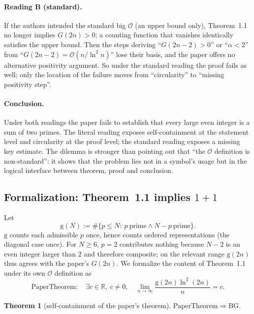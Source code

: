 \documentclass[11pt,a4paper]{article}
\theoremstyle{plain}
\newtheorem{theorem}{Theorem}[section]
\theoremstyle{definition}
\newcommand{\BG}{\mathrm{BG}}
\newcommand{\PaperTheorem}{\mathrm{PaperTheorem}}
\newcommand{\gcount}{\mathrm{g}}
\newcommand{\R}{\mathbb{R}}
\begin{document}
\paragraph{Reading B (standard).}
If the authors intended the standard big $\mathcal O$ (an upper bound only), Theorem~1.1 no longer implies $G(2n)>0$; a counting function that vanishes identically satisfies the upper bound. Then the steps deriving ``$G(2n-2)>0$'' or ``$\alpha<2$'' from ``$G(2n-2)=\mathcal O(n/\ln^2 n)$'' lose their basis, and the paper offers no alternative positivity argument. So under the standard reading the proof fails as well; only the location of the failure moves from ``circularity'' to ``missing positivity step''.

\paragraph{Conclusion.}
Under both readings the paper fails to establish that every large even integer is a sum of two primes. The literal reading exposes self-containment at the statement level and circularity at the proof level; the standard reading exposes a missing key estimate. The dilemma is stronger than pointing out that ``the $\mathcal O$ definition is non-standard'': it shows that the problem lies not in a symbol's usage but in the logical interface between theorem, proof and conclusion.

\subsection{Formalization: Theorem~1.1 implies $1+1$}
\label{sec:paper-formal}

Let
\begin{equation}
\gcount(N):=\#\{p\le N:\ p\ \text{prime}\land N-p\ \text{prime}\}.
\label{eq:count}
\end{equation}
$\gcount$ counts each admissible $p$ once, hence counts ordered representations (the diagonal case once). For $N\ge6$, $p=2$ contributes nothing because $N-2$ is an even integer larger than $2$ and therefore composite; on the relevant range $\gcount(2n)$ thus agrees with the paper's $G(2n)$. We formalize the content of Theorem~1.1 under its own $\mathcal O$ definition as
\begin{equation}
\PaperTheorem:\quad \exists c\in\R,\ c\ne0,\quad
\lim_{n\to\infty}\frac{\gcount(2n)\ln^2(2n)}{n}=c.
\label{eq:papertheorem}
\end{equation}

\begin{theorem}[self-containment of the paper's theorem]
\label{thm:paper-implies-bg}
$\PaperTheorem\Longrightarrow\BG$.
\end{theorem}
\end{document}
